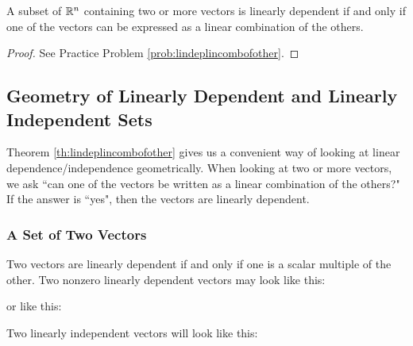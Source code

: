 \documentclass{ximera}
\begin{document}
\begin{theorem}\label{th:lindeplincombofother}
A subset of $\mathbb{R}^n$ containing two or more vectors is linearly dependent if and only if one of the vectors can be expressed as a linear combination of the others.
\end{theorem}
\begin{proof}
See Practice Problem \ref{prob:lindeplincombofother}.
\end{proof}

\subsection*{Geometry of Linearly Dependent and Linearly Independent Sets}

Theorem \ref{th:lindeplincombofother} gives us a convenient way of looking at linear dependence/independence geometrically.  When looking at two or more vectors, we ask ``can one of the vectors be written as a linear combination of the others?"  If the answer is ``yes", then the vectors are linearly dependent.
\subsubsection*{A Set of Two Vectors}
Two vectors are linearly dependent if and only if one is a scalar multiple of the other.  Two nonzero linearly dependent vectors may look like this:
\begin{center}
\end{center}
or like this:
\begin{center}
\end{center}
Two linearly independent vectors will look like this:
\begin{center}
\end{center}
\end{document}

